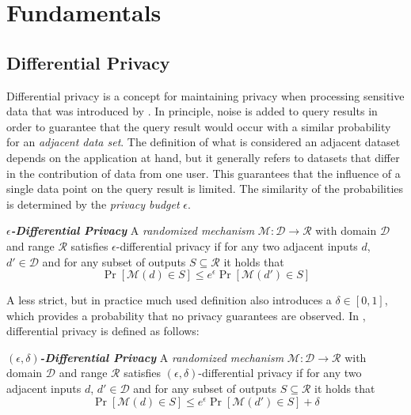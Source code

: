 \chapter{Fundamentals}

\section{Differential Privacy}

Differential privacy is a concept for maintaining privacy when processing sensitive data that was introduced by \textcite{dwork:2006}. In principle, noise is added to query results in order to guarantee that the query result would occur with a similar probability for an \textit{adjacent data set}. The definition of what is considered an adjacent dataset depends on the application at hand, but it generally refers to datasets that differ in the contribution of data from one user. This guarantees that the influence of a single data point on the query result is limited. The similarity of the probabilities is determined by the \textit{privacy budget} $\epsilon$.

\begin{definition}
  \emph{\textbf{$\epsilon$-Differential Privacy}} A \textit{randomized mechanism} $\mathcal{M}: \mathcal{D} \rightarrow \mathcal{R}$ with domain $\mathcal{D}$ and range $\mathcal{R}$ satisfies $\epsilon$-differential privacy if for any two adjacent inputs $d$, $d' \in \mathcal{D}$ and for any subset of outputs $S \subseteq \mathcal{R}$ it holds that $$\Pr[\mathcal{M}(d) \in S] \leq e^{\epsilon} \Pr[\mathcal{M}(d') \in S]$$

\end{definition}

A less strict, but in practice much used definition also introduces a $\delta \in [0,1]$, which provides a probability that no privacy guarantees are observed. In \textcite{abadi:2016}, differential privacy is defined as follows:

\begin{definition}
  \emph{\textbf{$(\epsilon, \delta)$-Differential Privacy}} A \textit{randomized mechanism} $\mathcal{M}: \mathcal{D} \rightarrow \mathcal{R}$ with domain $\mathcal{D}$ and range $\mathcal{R}$ satisfies $(\epsilon, \delta)$-differential privacy if for any two adjacent inputs $d$, $d' \in \mathcal{D}$ and for any subset of outputs $S \subseteq \mathcal{R}$ it holds that $$\Pr[\mathcal{M}(d) \in S] \leq e^{\epsilon} \Pr[\mathcal{M}(d') \in S] + \delta$$
\end{definition}


